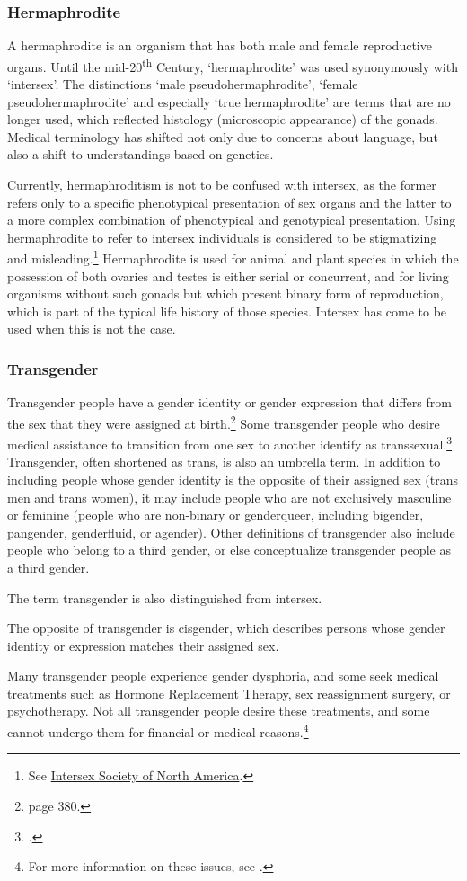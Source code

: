 \subsubsection*{Hermaphrodite}
\label{hermaphrodite}

A hermaphrodite is an organism that has both male and female reproductive organs. Until the mid-20\textsuperscript{th} Century, `hermaphrodite' was used synonymously with `intersex'. The distinctions `male pseudohermaphrodite', `female pseudohermaphrodite' and especially `true hermaphrodite' are terms that are no longer used, which reflected histology (microscopic appearance) of the gonads. Medical terminology has shifted not only due to concerns about language, but also a shift to understandings based on genetics.

Currently, hermaphroditism is not to be confused with intersex, as the former refers only to a specific phenotypical presentation of sex organs and the latter to a more complex combination of phenotypical and genotypical presentation. Using hermaphrodite to refer to intersex individuals is considered to be stigmatizing and misleading.\footnote{See \href{https://web.archive.org/web/20130701061246/http://www.isna.org/faq/hermaphrodite}{Intersex Society of North America}.} Hermaphrodite is used for animal and plant species in which the possession of both ovaries and testes is either serial or concurrent, and for living organisms without such gonads but which present binary form of reproduction, which is part of the typical life history of those species. Intersex has come to be used when this is not the case.

\subsubsection*{Transgender}

Transgender people have a gender identity or gender expression that differs from the sex that they were assigned at birth.\footnote{\cite{altilio} page 380.} Some transgender people who desire medical assistance to transition from one sex to another identify as transsexual.\footnote{\cite{polly}.} Transgender, often shortened as trans, is also an umbrella term. In addition to including people whose gender identity is the opposite of their assigned sex (trans men and trans women), it may include people who are not exclusively masculine or feminine (people who are non-binary or genderqueer, including bigender, pangender, genderfluid, or agender). Other definitions of transgender also include people who belong to a third gender, or else conceptualize transgender people as a third gender.

The term transgender is also distinguished from intersex. 

The opposite of transgender is cisgender, which describes persons whose gender identity or expression matches their assigned sex.

Many transgender people experience gender dysphoria, and some seek medical treatments such as Hormone Replacement Therapy, sex reassignment surgery, or psychotherapy. Not all transgender people desire these treatments, and some cannot undergo them for financial or medical reasons.\footnote{For more information on these issues, see \cite{maizes}.}
